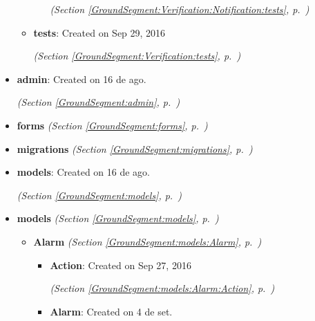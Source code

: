 \begin{itemize}
\begin{itemize}
\begin{itemize}
  \textit{(Section \ref{GroundSegment:Verification:Notification:tests}, p.~\pageref{GroundSegment:Verification:Notification:tests})}

      \end{itemize}
    \item \textbf{tests}: Created on Sep 29, 2016



  \textit{(Section \ref{GroundSegment:Verification:tests}, p.~\pageref{GroundSegment:Verification:tests})}

  \end{itemize}
\item \textbf{admin}: Created on 16 de ago.



  \textit{(Section \ref{GroundSegment:admin}, p.~\pageref{GroundSegment:admin})}

\item \textbf{forms}
  \textit{(Section \ref{GroundSegment:forms}, p.~\pageref{GroundSegment:forms})}

\item \textbf{migrations}
  \textit{(Section \ref{GroundSegment:migrations}, p.~\pageref{GroundSegment:migrations})}

\item \textbf{models}: Created on 16 de ago.



  \textit{(Section \ref{GroundSegment:models}, p.~\pageref{GroundSegment:models})}

\item \textbf{models}
  \textit{(Section \ref{GroundSegment:models}, p.~\pageref{GroundSegment:models})}

  \begin{itemize}
\setlength{\parskip}{0ex}
    \item \textbf{Alarm}
  \textit{(Section \ref{GroundSegment:models:Alarm}, p.~\pageref{GroundSegment:models:Alarm})}

      \begin{itemize}
    \setlength{\parskip}{0ex}
        \item \textbf{Action}: Created on Sep 27, 2016



  \textit{(Section \ref{GroundSegment:models:Alarm:Action}, p.~\pageref{GroundSegment:models:Alarm:Action})}

        \item \textbf{Alarm}: Created on 4 de set.




\end{itemize}
\end{itemize}
\end{itemize}
